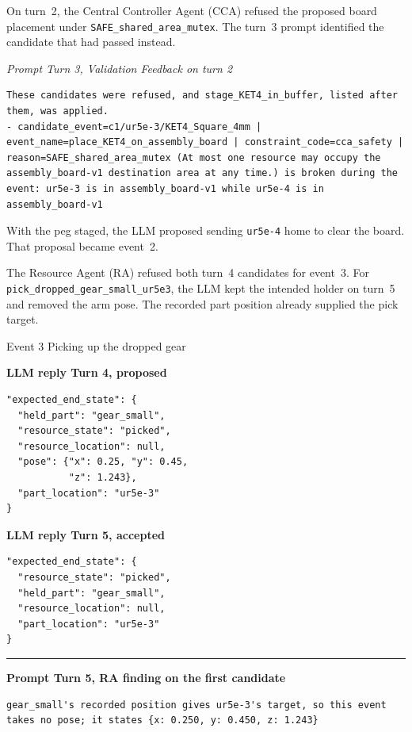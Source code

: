 \documentclass[preprint,12pt,authoryear]{elsarticle}
\let\code\nolinkurl
\newcommand{\recordlabel}[1]{\par\Needspace{4\baselineskip}\smallskip
  {\small\itshape #1\par}\nopagebreak}
\begin{document}
On turn~2, the Central Controller Agent (CCA) refused the proposed board placement under
\code{SAFE_shared_area_mutex}. The turn~3 prompt identified the candidate
that had passed instead.

\recordlabel{Prompt \enspace Turn 3, Validation Feedback on turn 2}
\begin{lstlisting}
These candidates were refused, and stage_KET4_in_buffer, listed after them, was applied.
- candidate_event=c1/ur5e-3/KET4_Square_4mm | event_name=place_KET4_on_assembly_board | constraint_code=cca_safety | reason=SAFE_shared_area_mutex (At most one resource may occupy the assembly_board-v1 destination area at any time.) is broken during the event: ur5e-3 is in assembly_board-v1 while ur5e-4 is in assembly_board-v1
\end{lstlisting}

With the peg staged, the LLM proposed sending \code{ur5e-4} home to clear
the board. That proposal became event~2.

The Resource Agent (RA) refused both turn~4 candidates for event~3. For
\code{pick_dropped_gear_small_ur5e3}, the LLM kept the intended holder on
turn~5 and removed the arm pose. The recorded part position already supplied
the pick target.

\begin{recordbox}{Event 3 \enspace Picking up the dropped gear}
\begin{minipage}[t]{0.483\linewidth}
{\small\bfseries LLM reply \enspace Turn 4, proposed}\par\smallskip
\begin{lstlisting}[style=recorded]
"expected_end_state": {
  "held_part": "gear_small",
  "resource_state": "picked",
  "resource_location": null,
  "pose": {"x": 0.25, "y": 0.45,
           "z": 1.243},
  "part_location": "ur5e-3"
}
\end{lstlisting}
\end{minipage}\hfill
\begin{minipage}[t]{0.483\linewidth}
{\small\bfseries LLM reply \enspace Turn 5, accepted}\par\smallskip
\begin{lstlisting}[style=recorded]
"expected_end_state": {
  "resource_state": "picked",
  "held_part": "gear_small",
  "resource_location": null,
  "part_location": "ur5e-3"
}
\end{lstlisting}
\end{minipage}
\par\medskip\hrule\smallskip
{\small\bfseries Prompt \enspace Turn 5, RA finding on the first candidate}\par\smallskip
\begin{lstlisting}[style=recorded]
gear_small's recorded position gives ur5e-3's target, so this event takes no pose; it states {x: 0.250, y: 0.450, z: 1.243}
\end{lstlisting}
\end{recordbox}
\end{document}
